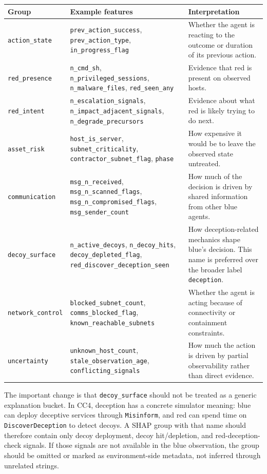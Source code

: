 \begin{longtable}{p{}p{}p{}}
\toprule
\textbf{Group} & \textbf{Example features} & \textbf{Interpretation} \\
\midrule
\texttt{action\_state} &
\texttt{prev\_action\_success}, \texttt{prev\_action\_type},
\texttt{in\_progress\_flag} &
Whether the agent is reacting to the outcome or duration of its previous action. \\
\texttt{red\_presence} &
\texttt{n\_cmd\_sh}, \texttt{n\_privileged\_sessions},
\texttt{n\_malware\_files}, \texttt{red\_seen\_any} &
Evidence that red is present on observed hosts. \\
\texttt{red\_intent} &
\texttt{n\_escalation\_signals}, \texttt{n\_impact\_adjacent\_signals},
\texttt{n\_degrade\_precursors} &
Evidence about what red is likely trying to do next. \\
\texttt{asset\_risk} &
\texttt{host\_is\_server}, \texttt{subnet\_criticality},
\texttt{contractor\_subnet\_flag}, \texttt{phase} &
How expensive it would be to leave the observed state untreated. \\
\texttt{communication} &
\texttt{msg\_n\_received}, \texttt{msg\_n\_scanned\_flags},
\texttt{msg\_n\_compromised\_flags}, \texttt{msg\_sender\_count} &
How much of the decision is driven by shared information from other blue agents. \\
\texttt{decoy\_surface} &
\texttt{n\_active\_decoys}, \texttt{n\_decoy\_hits},
\texttt{decoy\_depleted\_flag}, \texttt{red\_discover\_deception\_seen} &
How deception-related mechanics shape blue's decision. This name is preferred
over the broader label \texttt{deception}. \\
\texttt{network\_control} &
\texttt{blocked\_subnet\_count}, \texttt{comms\_blocked\_flag},
\texttt{known\_reachable\_subnets} &
Whether the agent is acting because of connectivity or containment constraints. \\
\texttt{uncertainty} &
\texttt{unknown\_host\_count}, \texttt{stale\_observation\_age},
\texttt{conflicting\_signals} &
How much the action is driven by partial observability rather than direct evidence. \\
\bottomrule
\end{longtable}

The important change is that \texttt{decoy\_surface} should not be treated as a
generic explanation bucket. In CC4, deception has a concrete simulator meaning:
blue can deploy deceptive services through \texttt{Misinform}, and red can spend
time on \texttt{DiscoverDeception} to detect decoys. A SHAP group with that name
should therefore contain only decoy deployment, decoy hit/depletion, and
red-deception-check signals. If those signals are not available in the blue
observation, the group should be omitted or marked as environment-side metadata,
not inferred through unrelated strings.

